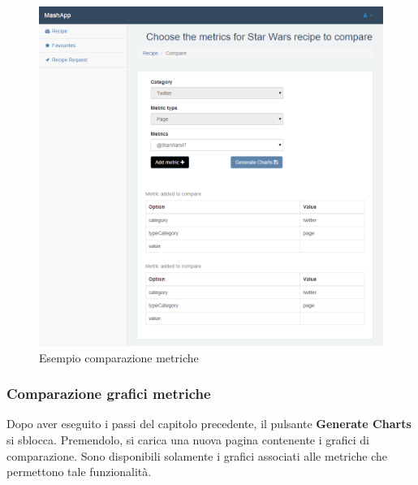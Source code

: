 			\begin{figure}[H]
				\centering
				\centerline{\includegraphics[width=14cm]{images/esempio_comparazione_metriche.png}}
				\caption{Esempio comparazione metriche}
				\label{fig:esempio_comparazione_metriche}
			\end{figure}


		\subsubsection{Comparazione grafici metriche} %
		\label{sec:comparazione_grafici_metriche}
			Dopo aver eseguito i passi del capitolo precedente, il pulsante \textbf{Generate Charts} si sblocca. Premendolo, si carica una nuova pagina contenente i grafici di comparazione.\newline
			Sono disponibili solamente i grafici associati alle metriche\gloss{} che permettono tale funzionalità.



	\pagebreak
